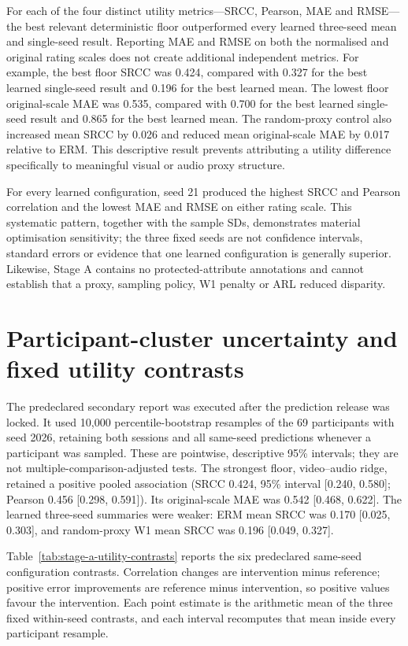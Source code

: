 For each of the four distinct utility metrics---SRCC, Pearson, MAE and RMSE---the best relevant
deterministic floor outperformed every learned three-seed mean and single-seed result. Reporting
MAE and RMSE on both the normalised and original rating scales does not create additional
independent metrics. For example, the best floor SRCC was
0.424, compared with 0.327 for the best learned single-seed result and 0.196 for the best
learned mean. The lowest floor original-scale MAE was 0.535, compared with 0.700 for the
best learned single-seed result and 0.865 for the best learned mean. The random-proxy control
also increased mean SRCC by 0.026 and reduced mean original-scale MAE by 0.017 relative to
ERM. This descriptive result prevents attributing a utility difference specifically to meaningful
visual or audio proxy structure.

For every learned configuration, seed 21 produced the highest SRCC and Pearson correlation and the
lowest MAE and RMSE on either rating scale. This systematic pattern, together with the
sample SDs, demonstrates material optimisation sensitivity; the three fixed seeds are not confidence
intervals, standard errors or evidence that one learned configuration is generally superior.
Likewise, Stage A contains no protected-attribute annotations and cannot establish that a proxy,
sampling policy, W1 penalty or ARL reduced disparity.

\section{Participant-cluster uncertainty and fixed utility contrasts}

The predeclared secondary report was executed after the prediction release was locked. It used
10,000 percentile-bootstrap resamples of the 69 participants with seed 2026, retaining both
sessions and all same-seed predictions whenever a participant was sampled. These are pointwise,
descriptive 95\% intervals; they are not multiple-comparison-adjusted tests. The strongest floor,
video--audio ridge, retained a positive pooled association (SRCC 0.424, 95\% interval
[0.240, 0.580]; Pearson 0.456 [0.298, 0.591]). Its original-scale MAE was 0.542
[0.468, 0.622]. The learned three-seed summaries were weaker: ERM mean SRCC was 0.170
[0.025, 0.303], and random-proxy W1 mean SRCC was 0.196
[0.049, 0.327].

Table~\ref{tab:stage-a-utility-contrasts} reports the six predeclared same-seed configuration
contrasts. Correlation changes are intervention minus reference; positive error improvements are
reference minus intervention, so positive values favour the intervention. Each point estimate is
the arithmetic mean of the three fixed within-seed contrasts, and each interval recomputes that
mean inside every participant resample.


